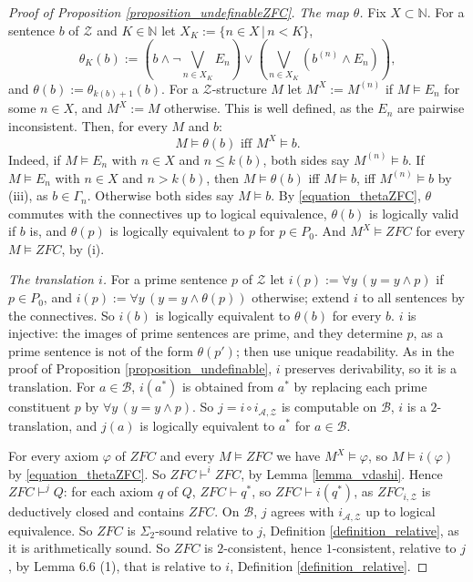 \documentclass{amsart}  %
\numberwithin{equation}{section}
\theoremstyle{definition}
\theoremstyle{remark}
\begin{document}
\begin{proof} [Proof of Proposition \ref{proposition_undefinableZFC}]
\emph{The map $\theta$.} Fix $X \subset \mathbb{N}$. For a sentence $b$ of $\mathcal{Z}$ and $K \in \mathbb{N}$ let $X _{K} := \{n \in X \,|\, n < K\}$,
$$\theta _{K} (b) := \left( b \land \neg \bigvee _{n \in X _{K}} E _{n} \right) \lor \left( \bigvee _{n \in X _{K}} \left( b ^{(n)} \land E _{n} \right) \right),$$
and $\theta (b) := \theta _{k (b) + 1} (b)$. For a $\mathcal{Z}$-structure $M$ let $M ^{X} := M ^{(n)}$ if $M \models E _{n}$ for some $n \in X$, and $M ^{X} := M$ otherwise. This is well defined, as the $E _{n}$ are pairwise inconsistent. Then, for every $M$ and $b$:
\begin{equation} \label{equation_thetaZFC}
M \models \theta (b) \text{ iff } M ^{X} \models b.
\end{equation}
Indeed, if $M \models E _{n}$ with $n \in X$ and $n \leq k (b)$, both sides say $M ^{(n)} \models b$. If $M \models E _{n}$ with $n \in X$ and $n > k (b)$, then $M \models \theta (b)$ iff $M \models b$, iff $M ^{(n)} \models b$ by (iii), as $b \in \Gamma _{n}$. Otherwise both sides say $M \models b$. By \eqref{equation_thetaZFC}, $\theta$ commutes with the connectives up to logical equivalence, $\theta (b)$ is logically valid if $b$ is, and $\theta (p)$ is logically equivalent to $p$ for $p \in P _{0}$. And $M ^{X} \models ZFC$ for every $M \models ZFC$, by (i).

\emph{The translation $i$.} For a prime sentence $p$ of $\mathcal{Z}$ let $i (p) := \forall y \, (y = y \land p)$ if $p \in P _{0}$, and $i (p) := \forall y \, (y = y \land \theta (p))$ otherwise; extend $i$ to all sentences by the connectives. So $i (b)$ is logically equivalent to $\theta (b)$ for every $b$. $i$ is injective: the images of prime sentences are prime, and they determine $p$, as a prime sentence is not of the form $\theta (p')$; then use unique readability. As in the proof of Proposition \ref{proposition_undefinable}, $i$ preserves derivability, so it is a translation. For $a \in \mathcal{B}$, $i (a ^{\ast})$ is obtained from $a ^{\ast}$ by replacing each prime constituent $p$ by $\forall y \, (y = y \land p)$. So $j = i \circ i _{\mathcal{A}, \mathcal{Z}}$ is computable on $\mathcal{B}$, $i$ is a $2$-translation, and $j (a)$ is logically equivalent to $a ^{\ast}$ for $a \in \mathcal{B}$.

For every axiom $\varphi$ of $ZFC$ and every $M \models ZFC$ we have $M ^{X} \models \varphi$, so $M \models i (\varphi)$ by \eqref{equation_thetaZFC}. So $ZFC \vdash ^{i} ZFC$, by Lemma \ref{lemma_vdashi}. Hence $ZFC \vdash ^{j} Q$: for each axiom $q$ of $Q$, $ZFC \vdash q ^{\ast}$, so $ZFC \vdash i (q ^{\ast})$, as $ZFC _{i, \mathcal{Z}}$ is deductively closed and contains $ZFC$. On $\mathcal{B}$, $j$ agrees with $i _{\mathcal{A}, \mathcal{Z}}$ up to logical equivalence. So $ZFC$ is $\Sigma _{2}$-sound relative to $j$, Definition \ref{definition_relative}, as it is arithmetically sound. So $ZFC$ is $2$-consistent, hence $1$-consistent, relative to $j$, by Lemma 6.6 (1), that is relative to $i$, Definition \ref{definition_relative}.


\end{proof}
\end{document}
